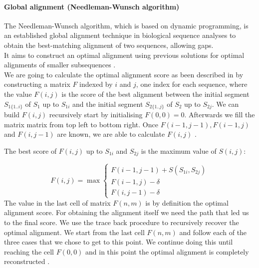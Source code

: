 \documentclass[11pt,a4paper]{report}
\begin{document}

\paragraph{ Global alignment (Needleman-Wunsch algorithm) }

The Needleman-Wunsch algorithm, which is based on dynamic programming, 
is an established global alignment technique in biological 
sequence analyses to obtain the best-matching alignment of two sequences, 
allowing  gaps.\\
It aims to construct an optimal alignment using previous solutions for
optimal alignments of smaller subsequences \cite{durbin}.\\
We are going to calculate the optimal alignment score as been described 
in\cite{durbin} by constructing a matrix $F$ indexed
by $i$ and $j$, one index for each sequence, where the value $F(i, j)$ is the score
of the best alignment between the initial segment $S_{1\{1..i\}}$ of $S_{1}$ 
up to $S_{1i}$ and the initial segment $S_{2\{1..j\}}$ of $S_{2}$  up to 
$S_{2j}$. We can build $F(i, j)$ recursively start by initialising 
$F(0, 0) = 0$. Afterwards we fill the matrix matrix from top left to 
bottom right. 
Once $ F(i-1, j-1 ), F(i-1 , j) $ and $ F(i , j-1) $ are known, we 
are able to calculate $ F(i, j)$ \cite{durbin}.

The best score of $F(i,j)$ up to $S_{1i}$ and $S_{2j}$ is the maximum 
value of $S(i,j)$:

\[ F(i,j)= \max
\begin{cases}
   F(i-1,j-1) + S(S_{1i} , S_{2j})\\
   F(i-1 , j)- \delta\\
   F(i,j-1)- \delta
\end{cases}
\]
The value in the last cell of matrix $F(n,m)$ is by definition the optimal 
alignment score. 
For obtaining the alignment itself we need the path that led us to the 
final score. We use the trace back procedure to recursively recover the 
optimal alignment\cite{durbin}\cite{eddydynamic}.
We start from the last cell $F(n,m)$ and follow each of the three cases 
that we chose to get to this point. We continue doing this until reaching
the cell $F(0,0)$ and in this point the optimal alignment is completely 
reconstructed \cite{eddydynamic}.




\end{document}
